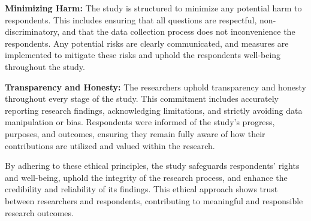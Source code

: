 	\textbf{Minimizing Harm:} The study is structured to minimize any potential harm to respondents. This includes ensuring that all questions are respectful, non-discriminatory, and that the data collection process does not inconvenience the respondents. Any potential risks are clearly communicated, and measures are implemented to mitigate these risks and uphold the respondents well-being throughout the study.
	
	\textbf{Transparency and Honesty: } The researchers uphold transparency and honesty throughout every stage of the study. This commitment includes accurately reporting research findings, acknowledging limitations, and strictly avoiding data manipulation or bias. Respondents were informed of the study's progress, purposes, and outcomes, ensuring they remain fully aware of how their contributions are utilized and valued within the research.
	
	By adhering to these ethical principles, the study safeguards respondents' rights and well-being, uphold the integrity of the research process, and enhance the credibility and reliability of its findings. This ethical approach shows trust between researchers and respondents, contributing to meaningful and responsible research outcomes.
